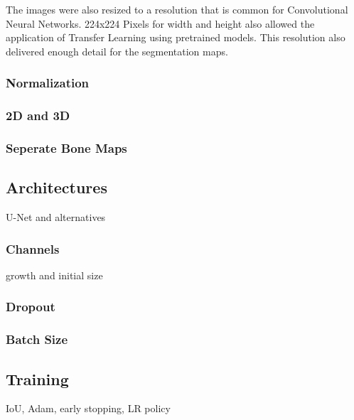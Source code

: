 The images were also resized to a resolution that is common for Convolutional Neural Networks. 224x224 Pixels for width and height also allowed the application of Transfer Learning using pretrained models. This resolution also delivered enough detail for the segmentation maps.

\subsubsection{Normalization}
\subsubsection{2D and 3D}
\subsubsection{Seperate Bone Maps}

\subsection{Architectures}

U-Net and alternatives

\subsubsection{Channels}

growth and initial size

\subsubsection{Dropout}

\subsubsection{Batch Size}

\subsection{Training}

IoU, Adam, early stopping, LR policy

\newpage
